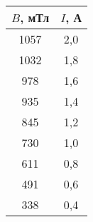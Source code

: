 \begin{table}[h!]
    \begin{center}
        \begin{tabular}{|c|c|}
            \hline
            $B$, мТл & $I$, А \\ \hline
            1057     & 2,0   \\ \hline
            1032     & 1,8  \\ \hline
            978      & 1,6  \\ \hline
            935      & 1,4  \\ \hline
            845      & 1,2  \\ \hline
            730      & 1,0   \\ \hline
            611      & 0,8  \\ \hline
            491      & 0,6  \\ \hline
            338      & 0,4  \\ \hline
            \end{tabular}
    \end{center}
    \caption{}
\end{table}